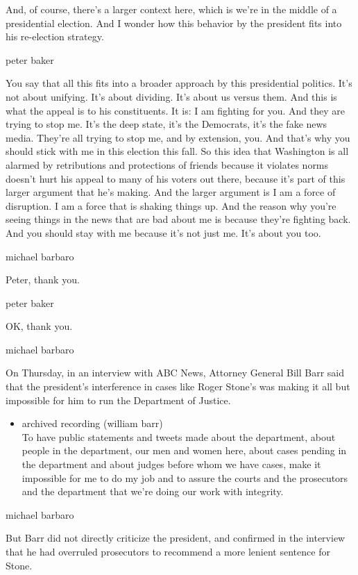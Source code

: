 And, of course, there's a larger context here, which is we're in the
middle of a presidential election. And I wonder how this behavior by the
president fits into his re-election strategy.

peter baker

You say that all this fits into a broader approach by this presidential
politics. It's not about unifying. It's about dividing. It's about us
versus them. And this is what the appeal is to his constituents. It is:
I am fighting for you. And they are trying to stop me. It's the deep
state, it's the Democrats, it's the fake news media. They're all trying
to stop me, and by extension, you. And that's why you should stick with
me in this election this fall. So this idea that Washington is all
alarmed by retributions and protections of friends because it violates
norms doesn't hurt his appeal to many of his voters out there, because
it's part of this larger argument that he's making. And the larger
argument is I am a force of disruption. I am a force that is shaking
things up. And the reason why you're seeing things in the news that are
bad about me is because they're fighting back. And you should stay with
me because it's not just me. It's about you too.

michael barbaro

Peter, thank you.

peter baker

OK, thank you.

michael barbaro

On Thursday, in an interview with ABC News, Attorney General Bill Barr
said that the president's interference in cases like Roger Stone's was
making it all but impossible for him to run the Department of Justice.

\begin{itemize}
\tightlist
\item
  archived recording (william barr)\\
  To have public statements and tweets made about the department, about
  people in the department, our men and women here, about cases pending
  in the department and about judges before whom we have cases, make it
  impossible for me to do my job and to assure the courts and the
  prosecutors and the department that we're doing our work with
  integrity.
\end{itemize}

michael barbaro

But Barr did not directly criticize the president, and confirmed in the
interview that he had overruled prosecutors to recommend a more lenient
sentence for Stone.

